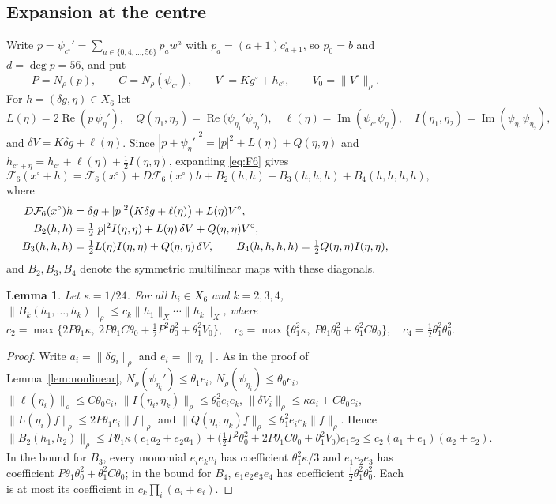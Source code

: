 \documentclass[11pt]{amsart}
\newtheorem{lemma}[theorem]{Lemma}
\theoremstyle{definition}
\theoremstyle{remark}
\numberwithin{equation}{section}
\newcommand{\Fc}{\mathcal{F}}
\DeclareMathOperator{\re}{Re}
\DeclareMathOperator{\im}{Im}
\newcommand{\nrm}[1]{\lVert #1\rVert}
\begin{document}
\subsection{Expansion at the centre}
Write $p=\psi_{c^\circ}'=\sum_{a\in\{0,4,\ldots,56\}}p_aw^a$ with $p_a=(a+1)c^\circ_{a+1}$, so $p_0=b$ and $d=\deg p=56$, and put
\[
P=N_\rho(p),\qquad C=N_\rho(\psi_{c^\circ}),\qquad V^\circ=Kg^\circ+h_{c^\circ},\qquad V_0=\nrm{V^\circ}_\rho .
\]
For $h=(\delta g,\eta)\in X_6$ let
\[
L(\eta)=2\re(\overline p\,\psi_\eta'),\quad Q(\eta_1,\eta_2)=\re\big(\psi_{\eta_1}'\overline{\psi_{\eta_2}'}\big),\quad \ell(\eta)=\im(\psi_{c^\circ}\psi_\eta),\quad I(\eta_1,\eta_2)=\im(\psi_{\eta_1}\psi_{\eta_2}),
\]
and $\delta V=K\delta g+\ell(\eta)$. Since $|p+\psi_\eta'|^2=|p|^2+L(\eta)+Q(\eta,\eta)$ and $h_{c^\circ+\eta}=h_{c^\circ}+\ell(\eta)+\frac12I(\eta,\eta)$, expanding \eqref{eq:F6} gives
\begin{equation}\label{eq:expansion6}
\Fc_6(x^\circ+h)=\Fc_6(x^\circ)+D\Fc_6(x^\circ)h+B_2(h,h)+B_3(h,h,h)+B_4(h,h,h,h),
\end{equation}
where
\begin{align}
D\Fc_6(x^\circ)h&=\delta g+|p|^2\big(K\delta g+\ell(\eta)\big)+L(\eta)V^\circ,\label{eq:DF6}\\
B_2(h,h)&=\tfrac12|p|^2I(\eta,\eta)+L(\eta)\,\delta V+Q(\eta,\eta)V^\circ,\notag\\
B_3(h,h,h)&=\tfrac12L(\eta)I(\eta,\eta)+Q(\eta,\eta)\,\delta V,\qquad B_4(h,h,h,h)=\tfrac12Q(\eta,\eta)I(\eta,\eta),\notag
\end{align}
and $B_2,B_3,B_4$ denote the symmetric multilinear maps with these diagonals.

\begin{lemma}\label{lem:nonlinear6}
Let $\kappa=1/24$. For all $h_i\in X_6$ and $k=2,3,4$, $\nrm{B_k(h_1,\ldots,h_k)}_\rho\leq c_k\nrm{h_1}_X\cdots\nrm{h_k}_X$, where
\[
c_2=\max\{2P\theta_1\kappa,\ 2P\theta_1C\theta_0+\tfrac12P^2\theta_0^2+\theta_1^2V_0\},\quad c_3=\max\{\theta_1^2\kappa,\ P\theta_1\theta_0^2+\theta_1^2C\theta_0\},\quad c_4=\tfrac12\theta_1^2\theta_0^2 .
\]
\end{lemma}

\begin{proof}
Write $a_i=\nrm{\delta g_i}_\rho$ and $e_i=\nrm{\eta_i}$. As in the proof of Lemma~\ref{lem:nonlinear}, $N_\rho(\psi_{\eta_i}')\leq\theta_1e_i$, $N_\rho(\psi_{\eta_i})\leq\theta_0e_i$, $\nrm{\ell(\eta_i)}_\rho\leq C\theta_0e_i$, $\nrm{I(\eta_i,\eta_k)}_\rho\leq\theta_0^2e_ie_k$, $\nrm{\delta V_i}_\rho\leq\kappa a_i+C\theta_0e_i$, $\nrm{L(\eta_i)f}_\rho\leq2P\theta_1e_i\nrm f_\rho$ and $\nrm{Q(\eta_i,\eta_k)f}_\rho\leq\theta_1^2e_ie_k\nrm f_\rho$. Hence
\[
\nrm{B_2(h_1,h_2)}_\rho\leq P\theta_1\kappa(e_1a_2+e_2a_1)+\big(\tfrac12P^2\theta_0^2+2P\theta_1C\theta_0+\theta_1^2V_0\big)e_1e_2\leq c_2(a_1+e_1)(a_2+e_2).
\]
In the bound for $B_3$, every monomial $e_ie_ka_l$ has coefficient $\theta_1^2\kappa/3$ and $e_1e_2e_3$ has coefficient $P\theta_1\theta_0^2+\theta_1^2C\theta_0$; in the bound for $B_4$, $e_1e_2e_3e_4$ has coefficient $\frac12\theta_1^2\theta_0^2$. Each is at most its coefficient in $c_k\prod_i(a_i+e_i)$.
\end{proof}
\end{document}
